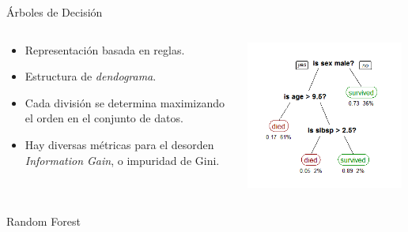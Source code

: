 \documentclass[11pt]{beamer}
\begin{document}
\begin{frame}{\'Arboles de Decisi\'on}
    \begin{columns}
    \begin{column}{0.5\textwidth}
    \begin{itemize}
        \item Representaci\'on basada en reglas.
        \item Estructura de \textit{dendograma}.
        \item Cada divisi\'on se determina maximizando el orden en el conjunto de datos.
        \item Hay diversas m\'etricas para el desorden \textit{Information Gain}, o impuridad de Gini.
    \end{itemize}
    \end{column}
    
    \begin{column}{0.5\textwidth}
    \begin{center}
    \includegraphics[width=0.98\textwidth]{images/CART_tree_titanic_survivors.png}
    \end{center}
    \end{column}
    
    \end{columns}
\end{frame}
\begin{frame}{Random Forest}

\end{frame}
\end{document}
